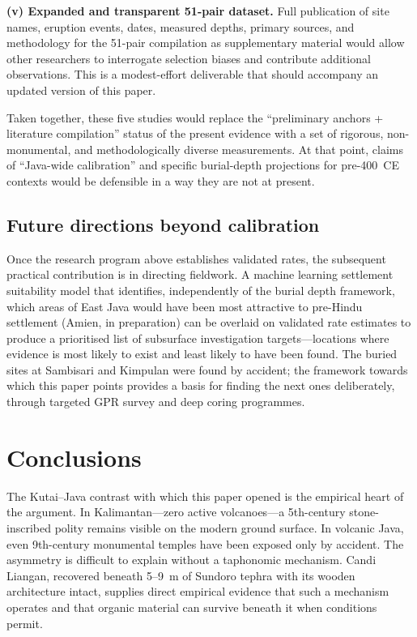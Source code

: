 \documentclass[12pt,a4paper]{article}
\begin{document}
\textbf{(v) Expanded and transparent 51-pair dataset.} Full publication of site names, eruption events, dates, measured depths, primary sources, and methodology for the 51-pair compilation as supplementary material would allow other researchers to interrogate selection biases and contribute additional observations. This is a modest-effort deliverable that should accompany an updated version of this paper.

Taken together, these five studies would replace the ``preliminary anchors + literature compilation'' status of the present evidence with a set of rigorous, non-monumental, and methodologically diverse measurements. At that point, claims of ``Java-wide calibration'' and specific burial-depth projections for pre-400~CE contexts would be defensible in a way they are not at present.

\subsection{Future directions beyond calibration}

Once the research program above establishes validated rates, the subsequent practical contribution is in directing fieldwork. A machine learning settlement suitability model that identifies, independently of the burial depth framework, which areas of East Java would have been most attractive to pre-Hindu settlement (Amien, in preparation) can be overlaid on validated rate estimates to produce a prioritised list of subsurface investigation targets---locations where evidence is most likely to exist and least likely to have been found. The buried sites at Sambisari and Kimpulan were found by accident; the framework towards which this paper points provides a basis for finding the next ones deliberately, through targeted GPR survey and deep coring programmes.


\section{Conclusions}

The Kutai--Java contrast with which this paper opened is the empirical heart of the argument. In Kalimantan---zero active volcanoes---a 5th-century stone-inscribed polity remains visible on the modern ground surface. In volcanic Java, even 9th-century monumental temples have been exposed only by accident. The asymmetry is difficult to explain without a taphonomic mechanism. Candi Liangan, recovered beneath 5--9~m of Sundoro tephra with its wooden architecture intact, supplies direct empirical evidence that such a mechanism operates and that organic material can survive beneath it when conditions permit.
\end{document}
